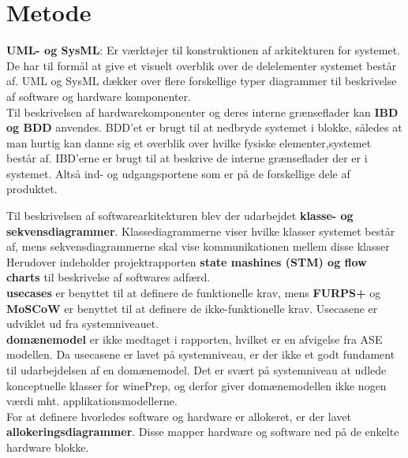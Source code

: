 \section{Metode}

\textbf{UML- og SysML}: Er værktøjer til konstruktionen af arkitekturen for systemet. De har til formål at give et visuelt overblik over de delelementer 
systemet består af. UML og SysML dækker over flere forskellige typer diagrammer til beskrivelse af software og hardware komponenter. \\ 

Til beskrivelsen af hardwarekomponenter og deres interne grænseflader kan \textbf {IBD og BDD} anvendes. BDD’et er brugt til at nedbryde systemet i blokke, 
således at man hurtig kan danne sig et overblik over hvilke fysiske elementer,systemet består af. IBD’erne er brugt til at beskrive de interne grænseflader der 
er i systemet. Altså ind- og udgangsportene som er på de forskellige dele af produktet.

Til beskrivelsen af softwarearkitekturen blev der udarbejdet \textbf{klasse- og sekvensdiagrammer}. Klassediagrammerne viser hvilke klasser systemet 
består af, mens sekvensdiagrammerne skal vise kommunikationen mellem disse klasser \\

Herudover indeholder projektrapporten \textbf{state mashines (STM) og flow charts} til beskrivelse af softwares adfærd.\\

\textbf{usecases}  er benyttet til at definere de funktionelle krav, mens \textbf{FURPS+} og \textbf{MoSCoW} er benyttet til at definere de 
ikke-funktionelle krav. Usecasene er udviklet ud fra systemniveauet.\\

\textbf{domænemodel} er ikke medtaget i rapporten, hvilket er en afvigelse fra ASE modellen. Da usecasene er lavet på systemniveau, er der ikke et godt 
fundament til udarbejdelsen af en domænemodel. Det er svært på systemniveau at udlede konceptuelle klasser for winePrep, og derfor giver domænemodellen ikke 
nogen værdi mht. applikationsmodellerne.\\
 
For at definere hvorledes software og hardware er allokeret, er der lavet \textbf{allokeringsdiagrammer}. Disse mapper hardware og software ned på de enkelte
hardware blokke.\\
